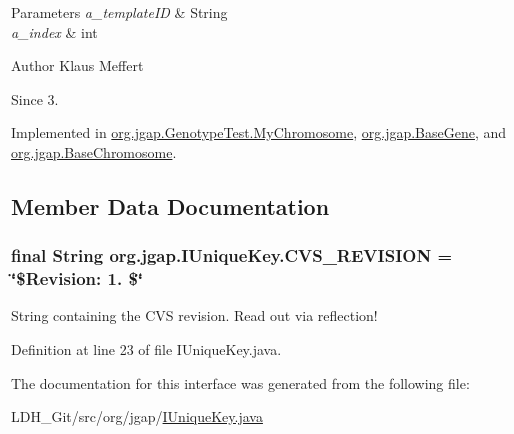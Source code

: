 \begin{DoxyParams}{Parameters}
{\em a\-\_\-template\-I\-D} & String \\
\hline
{\em a\-\_\-index} & int\\
\hline
\end{DoxyParams}
\begin{DoxyAuthor}{Author}
Klaus Meffert 
\end{DoxyAuthor}
\begin{DoxySince}{Since}
3. 
\end{DoxySince}


Implemented in \hyperlink{classorg_1_1jgap_1_1_genotype_test_1_1_my_chromosome_a4569712147dd31fb4307dfe88e7bb283}{org.\-jgap.\-Genotype\-Test.\-My\-Chromosome}, \hyperlink{classorg_1_1jgap_1_1_base_gene_aa7d9f1c3c2e727d496d66a85818c17d0}{org.\-jgap.\-Base\-Gene}, and \hyperlink{classorg_1_1jgap_1_1_base_chromosome_a06156bb0f2c8512ca6a7f7f0fee305b9}{org.\-jgap.\-Base\-Chromosome}.



\subsection{Member Data Documentation}
\hypertarget{interfaceorg_1_1jgap_1_1_i_unique_key_a5b6472b1e40001ee262da59ee449a77b}{
\subsubsection[{C\-V\-S\-\_\-\-R\-E\-V\-I\-S\-I\-O\-N}]{\setlength{\rightskip}{0pt plus 5cm}final String org.\-jgap.\-I\-Unique\-Key.\-C\-V\-S\-\_\-\-R\-E\-V\-I\-S\-I\-O\-N = \char`\"{}\$Revision\-: 1. \$\char`\"{}\hspace{0.3cm}{\ttfamily [static]}}}\label{interfaceorg_1_1jgap_1_1_i_unique_key_a5b6472b1e40001ee262da59ee449a77b}
String containing the C\-V\-S revision. Read out via reflection! 

Definition at line 23 of file I\-Unique\-Key.\-java.



The documentation for this interface was generated from the following file\-:\begin{DoxyCompactItemize}
\item 
L\-D\-H\-\_\-\-Git/src/org/jgap/\hyperlink{_i_unique_key_8java}{I\-Unique\-Key.\-java}\end{DoxyCompactItemize}
